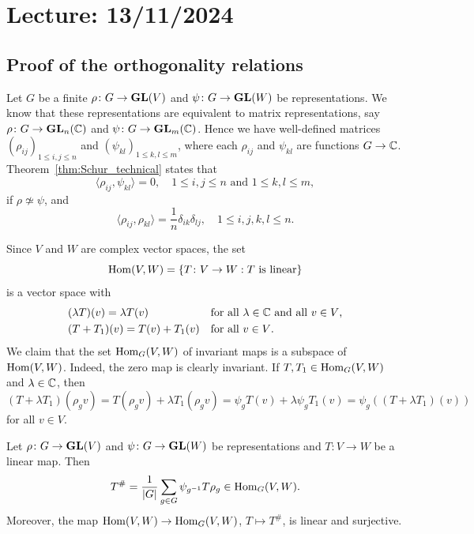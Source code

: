 \section{Lecture: 13/11/2024}
\label{8}

\subsection{Proof of the orthogonality relations}
\label{subsection:Schur_proof}

Let $G$ be a finite $\rho\colon G\to\mathbf{GL}(V)$ and $\psi\colon G\to\mathbf{GL}(W)$ be representations. We know that
these representations are equivalent to matrix representations, say 
$\rho\colon G\to\mathbf{GL}_n(\mathbb{C})$
and $\psi\colon G\to\mathbf{GL}_m(\mathbb{C})$. Hence 
we have well-defined matrices
$(\rho_{ij})_{1\leq i,j\leq n}$ and 
$(\psi_{kl})_{1\leq k,l\leq m}$, where 
each $\rho_{ij}$ and $\psi_{kl}$ are
functions $G\to\mathbb{C}$. Theorem~\ref{thm:Schur_technical} 
states that 
\[
\langle\rho_{ij},\psi_{kl}\rangle=0, 
\quad 
1\leq i,j\leq n\text{ and }1\leq k,l\leq m, 
\]
if $\rho\not\simeq\psi$, and 
\[
\langle\rho_{ij},\rho_{kl}\rangle=\frac{1}{n}\delta_{ik}\delta_{lj},\quad 1\leq i,j,k,l\leq n.  
\]

Since $V$ and $W$ are complex 
vector spaces, the set 
\[
\operatorname{Hom}(V,W)=\{T\colon V\to W:\text{$T$ is linear}\}
\]
is a vector space with 
\begin{align*}
&(\lambda T)(v)=\lambda T(v) && \text{for all $\lambda\in\mathbb{C}$ and all $v\in V$,}\\ 
&(T+T_1)(v)=T(v)+T_1(v) &&\text{for all $v\in V$.}
\end{align*}
We claim that the set $\operatorname{Hom}_G(V,W)$ of invariant maps
is a subspace of $\operatorname{Hom}(V,W)$. Indeed, the zero map is clearly invariant. If $T,T_1\in\operatorname{Hom}_G(V,W)$ 
and $\lambda\in\mathbb{C}$, then
\[
(T+\lambda T_1)(\rho_g v)
=T(\rho_gv)+\lambda T_1(\rho_gv)
=\psi_gT(v)+\lambda \psi_gT_1(v)
=\psi_g((T+\lambda T_1)(v))
\]
for all $v\in V$. 
 
\begin{proposition}
\label{pro:T_invariant}
	Let $\rho\colon G\to\mathbf{GL}(V)$ and $\psi\colon G\to\mathbf{GL}(W)$ be representations
	and $T\colon V\to W$ be a linear map. Then
	\[
	T^{\#}=\frac{1}{|G|}\sum_{g\in G}\psi_{g^{-1}}T\rho_g\in\operatorname{Hom}_G(V,W).
	\]
	Moreover, the map $\operatorname{Hom}(V,W)\to\operatorname{Hom}_G(V,W)$, $T\mapsto T^{\#}$, is linear and surjective.  
\end{proposition}

